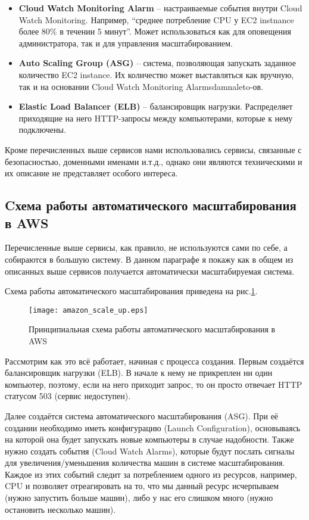 \begin{itemize}
	\item \textbf{Cloud Watch Monitoring Alarm} -- настраиваемые события внутри Cloud Watch Monitoring. Например, ``среднее потребление CPU у EC2 instnance более 80\% в течении 5 минут''. Может использоваться как для оповещения администратора, так и для управления масштабированием.
	\item \textbf{Auto Scaling Group (ASG)} -- система, позволяющая запускать заданное количество EC2 instance. Их количество может выставляться как вручную, так и на основании Cloud Watch Monitoring Alarmsdamnaleto-ов.
	\item \textbf{Elastic Load Balancer (ELB)} -- балансировщик нагрузки. Распределяет приходящие на него HTTP-запросы между компьютерами, которые к нему подключены.
\end{itemize}


Кроме перечисленных выше сервисов нами использовались сервисы, связанные с безопасностью, доменными именами и.т.д., однако они являются техническими и их описание не представляет особого интереса.

\subsection{Cхема работы автоматического масштабирования в AWS}
	Перечисленные выше сервисы, как правило, не используются сами по себе, а собираются в большую систему. В данном параграфе я покажу как в общем из описанных выше сервисов получается автоматически масштабируемая система.
	
	Схема работы автоматического масштабирования приведена на рис.\ref{fig:aws_autoscaling}.
	
\begin{figure}[h]
    \centering
    \texttt{[image: amazon\_scale\_up.eps]} 
    \caption{Принципиальная схема работы автоматического масштабирования в AWS}
    \label{fig:aws_autoscaling}
\end{figure}
	Рассмотрим как это всё работает, начиная с процесса создания. Первым создаётся балансировщик нагрузки (ELB). В начале к нему не прикреплен ни один компьютер, поэтому, если на него приходит запрос, то он просто отвечает HTTP статусом 503 (сервис недоступен).
	
	Далее создаётся система автоматического масштабирования (ASG). При её создании необходимо иметь конфигурацию (Launch Configuration), основываясь на которой она будет запускать новые компьютеры в случае надобности. Также нужно создать события (Cloud Watch Alarms), которые будут послать сигналы для увеличения/уменьшения количества машин в системе масштабирования. Каждое из этих событий следит за потреблением одного из ресурсов, например, CPU и позволяет отреагировать на то, что мы данный ресурс исчерпываем (нужно запустить больше машин), либо у нас его слишком много (нужно остановить несколько машин).
	
